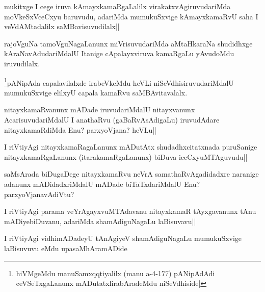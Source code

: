 \begin{artha}
mukitxge I cege iruva kAmayxkamaRgaLalilx virakatxvAgiruvudariMda moVkeSxVceCxyu baruvudu, adariMda mumukuSxvige kAmayxkamaRvU saha I veVdAMtadalilx saMBavisuvudilalx||
\end{artha}

\begin{artha}
rajoVguNa tamoVguNagaLanunx miVrisuvudariMda aMtaHkaraNa shudidhxge kAraNavAdudariMdalU Itanige cApalayxviruva kamaRgaLu yAvudoMdu iruvudilalx.
\end{artha}

\begin{artha}
\footnote{\stext hiVMgeMdu manuSamxqqtiyalilx (manu a-4-177) pANipAdAdi ceVSeTxgaLanunx mADutatxlirabAradeMdu niSeVdhiside|}pANipAda capalavilalxde irabeVkeMdu heVLi niSeVdhisiruvudariMdalU mumukuSxvige elilxyU capala kamaRvu saMBAvitavalalx.
\end{artha}

\begin{artha}
nitayxkamaRvanunx mADade iruvudariMdalU nitayxvanunx AcarisuvudariMdalU I anathaRvu (gaBaRvAsAdigaLu) iruvudAdare nitayxkamaRdiMda Enu? parxyoVjana? heVLu||
\end{artha}

\begin{artha}
I riVtiyAgi nitayxkamaRagaLanunx mADutAtx shudadhxcitatxnada puruSanige nitayxkamaRgaLanunx (itarakamaRgaLanunx) biDuva iceCxyuMTAguvudu||
\end{artha}


\begin{artha}
saMsArada biDugaDege nitayxkamaRvu neVrA samathaRvAgadidadxre naranige adanunx mADidadxriMdalU mADade biTaTxdariMdalU Enu?parxyoVjanavAdiVtu?
\end{artha}

\begin{artha}
I riVtiyAgi parama veYrAgayxvuMTAdavanu nitayxkamaR tAyxgavanunx tAnu mADiyebiDuvanu, adariMda shamAdiguNagaLu laBisuvavu||
\end{artha}

\begin{center}
I riVtiyAgi vidhimADadeyU tAnAgiyeV shamAdiguNagaLu mumukuSxvige laBisuvuvu eMdu upasaMhAramADide
\end{center}


